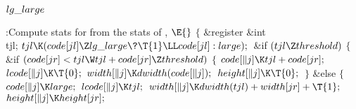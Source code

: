 \Y\B\4\D$\\{lg\_large}$ \5
\par
\Y\B\4:Compute stats for  from the stats of , \X${}\E{}$\6
${}\{{}$\1\6
\&{register} \&{int} \\{tjl};\7
${}\\{tjl}\K(\\{code}[\\{jl}]\Z\\{lg\_large}\?\T{1}\LL\\{code}[\\{jl}]:%
\\{large});{}$\6
\&{if} ${}(\\{tjl}\Z\\{threshold}){}$\5
${}\{{}$\1\6
\&{if} ${}(\\{code}[\\{jr}]<\\{tjl}\W\\{tjl}+\\{code}[\\{jr}]\Z%
\\{threshold}){}$\5
${}\{{}$\1\6
${}\\{code}[\|j]\K\\{tjl}+\\{code}[\\{jr}];{}$\6
${}\\{lcode}[\|j]\K\T{0};{}$\6
${}\\{width}[\|j]\K\\{dwidth}(\\{code}[\|j]);{}$\6
${}\\{height}[\|j]\K\T{0};{}$\6
\4${}\}{}$\2\6
\&{else}\5
${}\{{}$\1\6
${}\\{code}[\|j]\K\\{large};{}$\6
${}\\{lcode}[\|j]\K\\{tjl};{}$\6
${}\\{width}[\|j]\K\\{dwidth}(\\{tjl})+\\{width}[\\{jr}]+\T{1};{}$\6
${}\\{height}[\|j]\K\\{height}[\\{jr}];{}$\6
